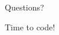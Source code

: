 \documentclass[xcolor=table]{beamer}
\begin{document}

\begin{frame}
\begin{center}
\Huge{Questions?}

\vspace{1cm}

\Large{Time to code!}
\end{center}
\end{frame}
\end{document}
